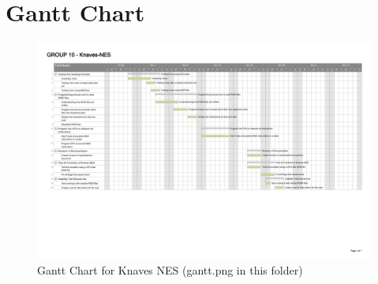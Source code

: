 \documentclass[12pt]{article}
\begin{document}
\section{Gantt Chart}
	\begin{figure}[H]
		\includegraphics[width=180mm]{gantt.png}
		\caption{Gantt Chart for Knaves NES (gantt.png in this folder)}
	\end{figure}

\begin{versionhistory}
\end{versionhistory}
\end{document}
